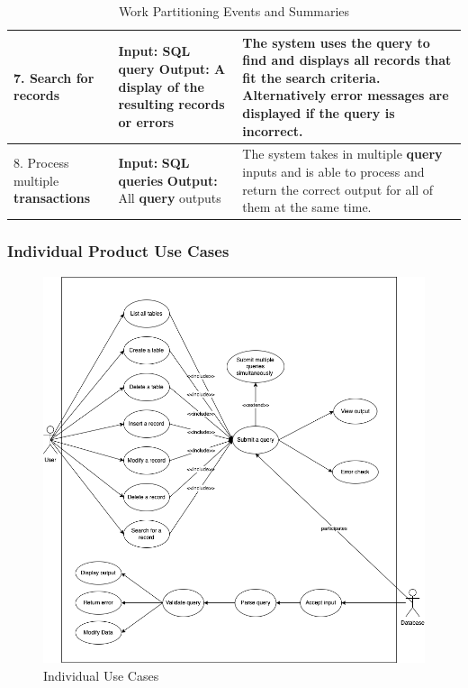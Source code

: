 \documentclass[12pt, titlepage]{article}
\begin{document}
\begin{table}[h!]
\begin{tabular}{|l|p{4cm}|p{7cm}|}
    \hline
    7. Search for \textbf{record}s & \textbf{Input:} \textbf{SQL} \textbf{query} \newline \textbf{Output:} A display of the resulting \textbf{record}s or errors &  The system uses the \textbf{query} to find and displays all \textbf{record}s that fit the search criteria. Alternatively error messages are displayed if the \textbf{query} is incorrect.\\
    \hline
    8. Process multiple \textbf{transactions} & \textbf{Input:} \textbf{SQL} \textbf{queries} \newline \textbf{Output:} All \textbf{query} outputs &  The system takes in multiple \textbf{query} inputs and is able to process and return the correct output for all of them at the same time.\\
    \hline
    \end{tabular}
\caption{Work Partitioning Events and Summaries}
\end{table}

\newpage
\subsubsection{Individual Product Use Cases}

\begin{figure}[h!]
    \centering
    \includegraphics[scale=0.4]{images/ReqDoc.png}
    \caption{Individual Use Cases}
    \label{fig:my_label}
\end{figure}
\end{document}
